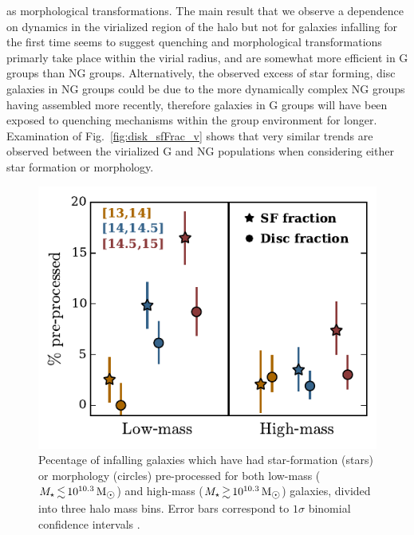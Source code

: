 \documentclass[a4paper,fleqn,usenatbib]{mnras}
\newcommand{\Msun}{\,\mathrm{M_{\sun}}}
\begin{document}
as morphological transformations.  The main result that we observe a
dependence on dynamics in the virialized region of the halo but not
for galaxies infalling for the first time seems to suggest quenching and
morphological transformations primarly take
place within the virial radius, and are somewhat more efficient in G
groups than NG groups.  Alternatively, the observed excess of star
forming, disc galaxies in NG groups could be due to the more
dynamically complex NG groups having assembled more recently,
therefore galaxies in G groups will have been exposed to quenching
mechanisms within the group environment for longer.  Examination of
Fig.~\ref{fig:disk_sfFrac_v} shows that very similar trends are observed
between the virialized G and NG populations when considering either
star formation or morphology.

\begin{figure}
  \centering
  \includegraphics[width=\columnwidth]{pp_mh.pdf}
  \caption{Pecentage of infalling galaxies which have had
    star-formation (stars) or morphology (circles) pre-processed for
    both low-mass ($M_\star \la 10^{10.3}\Msun$) and 
  high-mass ($M_\star \ga 10^{10.3}\Msun$) galaxies, divided into
  three halo mass bins.  Error bars correspond to $1\sigma$
  binomial confidence intervals \citep{cameron2011}.}
  \label{fig:pp_mh}
\end{figure}
\end{document}
